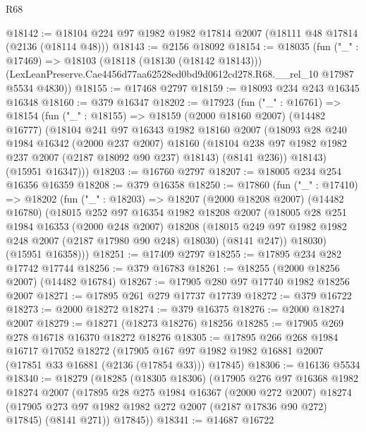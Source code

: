 \begin{lexlean}{R68}
\begin{coremodule}
@18142 := @18104 @224 @97 @1982 @1982 @17814 @2007 (@18111 @48 @17814 (@2136 (@18114 @48)))
@18143 := @2156 @18092
@18154 := @18035
    (fun ("_" : @17469) =>
    @18103
      (@18118 (@18130 (@18142 @18143)))
      (LexLeanPreserve.Cae4456d77aa62528ed0bd9d0612cd278.R68.__rel_10 @17987 @5534 @4830))
@18155 := @17468 @2797
@18159 := @18093 @234 @243 @16345 @16348
@18160 := @379 @16347
@18202 := @17923
    (fun ("_" : @16761) =>
    @18154
      (fun ("_" : @18155) =>
      @18159
        (@2000 @18160 @2007)
        (@14482 @16777)
        (@18104
          @241
          @97
          @16343
          @1982
          @18160
          @2007
          (@18093
            @28
            @240
            @1984
            @16342
            (@2000 @237 @2007)
            @18160
            (@18104 @238 @97 @1982 @1982 @237 @2007 (@2187 @18092 @90 @237) @18143)
            (@8141 @236))
          @18143)
        (@15951 @16347)))
@18203 := @16760 @2797
@18207 := @18005 @234 @254 @16356 @16359
@18208 := @379 @16358
@18250 := @17860
    (fun ("_" : @17410) =>
    @18202
      (fun ("_" : @18203) =>
      @18207
        (@2000 @18208 @2007)
        (@14482 @16780)
        (@18015
          @252
          @97
          @16354
          @1982
          @18208
          @2007
          (@18005
            @28
            @251
            @1984
            @16353
            (@2000 @248 @2007)
            @18208
            (@18015 @249 @97 @1982 @1982 @248 @2007 (@2187 @17980 @90 @248) @18030)
            (@8141 @247))
          @18030)
        (@15951 @16358)))
@18251 := @17409 @2797
@18255 := @17895 @234 @282 @17742 @17744
@18256 := @379 @16783
@18261 := @18255 (@2000 @18256 @2007) (@14482 @16784)
@18267 := @17905 @280 @97 @17740 @1982 @18256 @2007
@18271 := @17895 @261 @279 @17737 @17739
@18272 := @379 @16722
@18273 := @2000 @18272
@18274 := @379 @16375
@18276 := @2000 @18274 @2007
@18279 := @18271 (@18273 @18276) @18256
@18285 := @17905 @269 @278 @16718 @16370 @18272 @18276
@18305 := @17895
    @266
    @268
    @1984
    @16717
    @17052
    @18272
    (@17905 @167 @97 @1982 @1982 @16881 @2007 (@17851 @33 @16881 (@2136 (@17854 @33))) @17845)
@18306 := @16136 @5534
@18340 := @18279
    (@18285
      (@18305 @18306)
      (@17905
        @276
        @97
        @16368
        @1982
        @18274
        @2007
        (@17895
          @28
          @275
          @1984
          @16367
          (@2000 @272 @2007)
          @18274
          (@17905 @273 @97 @1982 @1982 @272 @2007 (@2187 @17836 @90 @272) @17845)
          (@8141 @271))
        @17845))
@18341 := @14687 @16722

\end{coremodule}
\end{lexlean}

